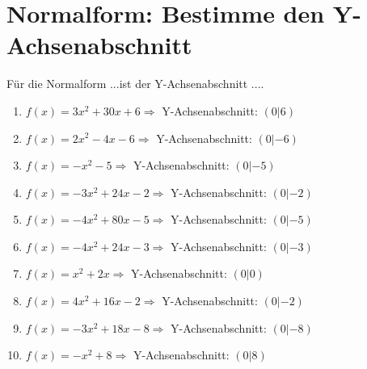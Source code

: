 \documentclass{article}%
\begin{document}
\section{Normalform: Bestimme den Y{-}Achsenabschnitt}%
\label{sec:NormalformBestimmedenY{-}Achsenabschnitt}%
Für die Normalform ...ist der Y{-}Achsenabschnitt ....%
\begin{enumerate}[label=\alph*)]%
\item%
\newline\vspace{0.5cm}$f(x)=3x^2 + 30x + 6 \Rightarrow $ Y-Achsenabschnitt: $ (0|6) $%
\item%
\newline\vspace{0.5cm}$f(x)=2x^2 - 4x - 6 \Rightarrow $ Y-Achsenabschnitt: $ (0|-6) $%
\item%
\newline\vspace{0.5cm}$f(x)=-x^2 - 5 \Rightarrow $ Y-Achsenabschnitt: $ (0|-5) $%
\item%
\newline\vspace{0.5cm}$f(x)=-3x^2 + 24x - 2 \Rightarrow $ Y-Achsenabschnitt: $ (0|-2) $%
\item%
\newline\vspace{0.5cm}$f(x)=-4x^2 + 80x - 5 \Rightarrow $ Y-Achsenabschnitt: $ (0|-5) $%
\item%
\newline\vspace{0.5cm}$f(x)=-4x^2 + 24x - 3 \Rightarrow $ Y-Achsenabschnitt: $ (0|-3) $%
\item%
\newline\vspace{0.5cm}$f(x)=x^2 + 2x \Rightarrow $ Y-Achsenabschnitt: $ (0|0) $%
\item%
\newline\vspace{0.5cm}$f(x)=4x^2 + 16x - 2 \Rightarrow $ Y-Achsenabschnitt: $ (0|-2) $%
\item%
\newline\vspace{0.5cm}$f(x)=-3x^2 + 18x - 8 \Rightarrow $ Y-Achsenabschnitt: $ (0|-8) $%
\item%
\newline\vspace{0.5cm}$f(x)=-x^2 + 8 \Rightarrow $ Y-Achsenabschnitt: $ (0|8) $%
\end{enumerate}
\end{document}
